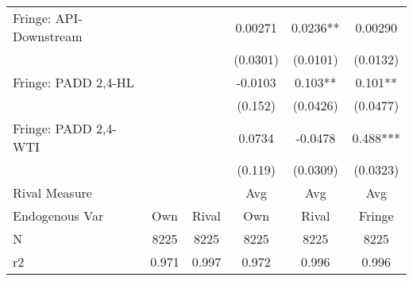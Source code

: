 {\begin{tabular}{l*{5}{c}}
\addlinespace
Fringe: API-Downstream&            &            &  0.00271   &   0.0236** &  0.00290   \\
                &            &            & (0.0301)   & (0.0101)   & (0.0132)   \\
\addlinespace
Fringe: PADD 2,4-HL&            &            &  -0.0103   &    0.103** &    0.101** \\
                &            &            &  (0.152)   & (0.0426)   & (0.0477)   \\
\addlinespace
Fringe: PADD 2,4-WTI&            &            &   0.0734   &  -0.0478   &    0.488***\\
                &            &            &  (0.119)   & (0.0309)   & (0.0323)   \\
\midrule
Rival Measure   &            &            &      Avg   &      Avg   &      Avg   \\
Endogenous Var  &      Own   &    Rival   &      Own   &    Rival   &   Fringe   \\
N               &     8225   &     8225   &     8225   &     8225   &     8225   \\
r2              &    0.971   &    0.997   &    0.972   &    0.996   &    0.996   \\
\bottomrule
\end{tabular}
}
